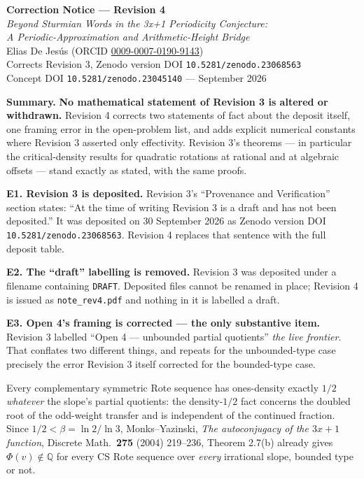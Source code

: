 \documentclass[11pt]{article}
\newcommand{\Q}{\mathbb{Q}}
\begin{document}
\begin{center}
{\large\bfseries Correction Notice --- Revision 4}\\[4pt]
{\itshape Beyond Sturmian Words in the 3x+1 Periodicity Conjecture:\\
A Periodic-Approximation and Arithmetic-Height Bridge}\\[3pt]
Elias De Jes\'us \quad (ORCID \href{https://orcid.org/0009-0007-0190-9143}{0009-0007-0190-9143})\\[3pt]
Corrects Revision 3, Zenodo version DOI \texttt{10.5281/zenodo.23068563}\\
Concept DOI \texttt{10.5281/zenodo.23045140} \quad ---  September 2026
\end{center}

\noindent\textbf{Summary.} \textbf{No mathematical statement of Revision 3 is altered or withdrawn.}
Revision 4 corrects two statements of fact about the deposit itself, one framing error in the
open-problem list, and adds explicit numerical constants where Revision 3 asserted only effectivity.
Revision 3's theorems --- in particular the critical-density results for quadratic rotations at
rational and at algebraic offsets --- stand exactly as stated, with the same proofs.

\medskip

\noindent\textbf{E1. Revision 3 is deposited.} Revision 3's ``Provenance and Verification'' section
states: ``At the time of writing Revision 3 is a draft and has not been deposited.'' It was deposited
on 30 September 2026 as Zenodo version DOI \texttt{10.5281/zenodo.23068563}. Revision 4 replaces that
sentence with the full deposit table.

\medskip

\noindent\textbf{E2. The ``draft'' labelling is removed.} Revision 3 was deposited under a filename
containing \texttt{DRAFT}. Deposited files cannot be renamed in place; Revision 4 is issued as
\texttt{note\_rev4.pdf} and nothing in it is labelled a draft.

\medskip

\noindent\textbf{E3. Open 4's framing is corrected --- the only substantive item.} Revision 3
labelled ``Open 4 --- unbounded partial quotients'' \emph{the live frontier}. That conflates two
different things, and repeats for the unbounded-type case precisely the error Revision 3 itself
corrected for the bounded-type case.

Every complementary symmetric Rote sequence has ones-density exactly $1/2$ \emph{whatever} the
slope's partial quotients: the density-$1/2$ fact concerns the doubled root of the odd-weight
transfer and is independent of the continued fraction. Since $1/2<\beta=\ln2/\ln3$, Monks--Yazinski,
\emph{The autoconjugacy of the $3x+1$ function}, Discrete Math.\ \textbf{275} (2004) 219--236,
Theorem 2.7(b) already gives $\Phi(v)\notin\Q$ for every CS Rote sequence over \emph{every} irrational
slope, bounded type or not.
\end{document}
